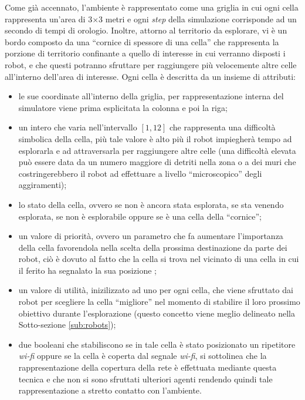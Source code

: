 Come già accennato, l'ambiente è rappresentato come una griglia in cui ogni cella rappresenta un'area di 3$\times$3 metri e ogni \textit{step} della simulazione corrisponde ad un secondo di tempi di orologio.
Inoltre, attorno al territorio da esplorare, vi è un bordo composto da una “cornice di spessore di una cella” che rappresenta la porzione di territorio confinante a quello di interesse in cui verranno disposti i robot, e che questi potranno sfruttare per raggiungere più velocemente altre celle all'interno dell'area di interesse.
Ogni cella è descritta da un insieme di attributi:
\begin{itemize}
	\item le sue coordinate all'interno della griglia, per rappresentazione interna del simulatore viene prima esplicitata la colonna e poi la riga;
	\item un intero che varia nell'intervallo $\left[1, 12\right]$ che rappresenta una difficoltà simbolica della cella, più tale valore è alto più il robot impiegherà tempo ad esplorarla e ad attraversarla per raggiungere altre celle (una difficoltà elevata può essere data da un numero maggiore di detriti nella zona o a dei muri che costringerebbero il robot ad effettuare a livello “microscopico” degli aggiramenti);
	\item lo stato della cella, ovvero se non è ancora stata esplorata, se sta venendo esplorata, se non è esplorabile oppure se è una cella della “cornice”;
	\item un valore di priorità, ovvero un parametro che fa aumentare l'importanza della cella favorendola nella scelta della prossima destinazione da parte dei robot, ciò è dovuto al fatto che la cella si trova nel vicinato di una cella in cui il ferito ha segnalato la sua posizione ;
	\item un valore di utilità, inizilizzato ad uno per ogni cella, che viene sfruttato dai robot per scegliere la cella “migliore” nel momento di stabilire il loro prossimo obiettivo durante l'esplorazione (questo concetto viene meglio delineato nella Sotto-sezione \ref{sub:robots});
	\item due booleani che stabiliscono se in tale cella è stato posizionato un ripetitore \textit{wi-fi} oppure se la cella è coperta dal segnale \textit{wi-fi}, si sottolinea che la rappresentazione della copertura della rete è effettuata mediante questa tecnica e che non si sono sfruttati ulteriori agenti rendendo quindi tale rappresentazione a stretto contatto con l'ambiente.
\end{itemize}


